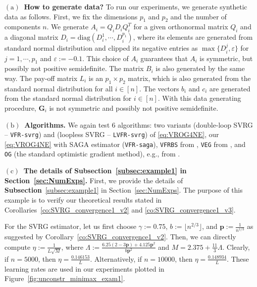 \documentclass{article}
\newcommand{\sets}[1]{\{#1\}}
\newcommand{\mbf}[1]{\mathbf{#1}}
\theoremstyle{plain}
\theoremstyle{definition}
\theoremstyle{remark}
\begin{document}
\textbf{$\mathrm{(a)}$~How to generate data?}
To run our experiments, we generate synthetic data as follows.
First, we fix the dimensions $p_1$ and $p_2$ and the number of components $n$.
We generate $A_i = Q_iD_iQ_i^T$ for a given orthonormal matrix $Q_i$ and a diagonal matrix $D_i = \mathrm{diag}(D_{i}^1, \cdots, D_{i}^{p_1})$, where its elements are generated from standard normal distribution and clipped its negative entries as $\max\sets{D_{i}^j, \varepsilon}$ for $j=1,\cdots, p_1$ and $\varepsilon := -0.1$.
This choice of $A_i$ guarantees that $A_i$ is symmetric, but possibly not positive semidefinite.
The matrix $B_i$ is also generated by the same way.
The pay-off matrix $L_i$ is an $p_1\times p_2$ matrix, which is also generated from the standard normal distribution  for all $i \in [n]$.
The vectors $b_i$ and $c_i$ are generated from the standard normal distribution for $i\in [n]$.
With this data generating procedure, $\mathbf{G}_i$ is not symmetric and possibly not positive semidefinite.

\textbf{$\mathrm{(b)}$~Algorithms.}
We again test 6 algorithms: two variants (double-loop SVRG -- \texttt{VFR-svrg}) and (loopless SVRG -- \texttt{LVFR-svrg}) of \eqref{eq:VROG4NE}, our \eqref{eq:VROG4NE} with SAGA estimator (\texttt{VFR-saga}), \texttt{VFRBS} from \citep{alacaoglu2022beyond}, \texttt{VEG} from \citep{alacaoglu2021stochastic}, and \texttt{OG} (the standard optimistic gradient method), e.g., from \citep{daskalakis2018training}.

\textbf{$\mathrm{(c)}$~The details of Subsection~\ref{subsec:example1} in Section~\ref{sec:NumExps}.}
First, we provide the details of \textbf{Subsection}~\ref{subsec:example1} in Section~\ref{sec:NumExps}.
The purpose of this example is to verify our theoretical results stated in Corollaries~\ref{co:SVRG_convergence1_v2} and \ref{co:SVRG_convergence1_v3}.

For the SVRG estimator, let us first choose $\gamma := 0.75$, $b := \lfloor n^{2/3}\rfloor$, and $\mbf{p} := \frac{1}{n^{1/3}}$ as suggested by Corollary~\ref{co:SVRG_convergence1_v2}.
Then, we can directly compute $\eta := \frac{1}{L\sqrt{M}}$, where  $\Lambda := \frac{6.25(2-3\mbf{p}) + 4.125 \mbf{p}^2}{b\mbf{p}^2}$ and $M = 2.375 + \frac{11}{3}\Lambda$.
Clearly, if $n = 5000$, then  $\eta =  \frac{0.146153}{L}$.
Alternatively, if $n= 10000$, then $\eta = \frac{0.148934}{L}$.
These learning rates are used in our experiments plotted in Figure~\ref{fig:unconstr_minimax_exam1}.
\end{document}
